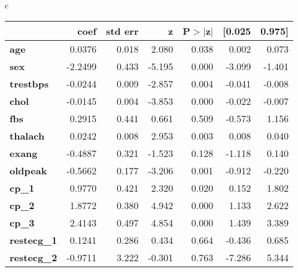 \begin{table*}[!tp]
{{\begin{tabular}{c}
        \begin{tabular*}{\textwidth}{l  @{\extracolsep{\fill}} rrrrrr}
                            & \textbf{coef} & \textbf{std err} & \textbf{z} & \textbf{P$> |$z$|$} & \textbf{[0.025} & \textbf{0.975]}  \\
        \midrule
        \textbf{age}        &       0.0376  &        0.018     &     2.080  &         0.038        &        0.002    &        0.073     \\
        \textbf{sex}        &      -2.2499  &        0.433     &    -5.195  &         0.000        &       -3.099    &       -1.401     \\
        \textbf{trestbps}   &      -0.0244  &        0.009     &    -2.857  &         0.004        &       -0.041    &       -0.008     \\
        \textbf{chol}       &      -0.0145  &        0.004     &    -3.853  &         0.000        &       -0.022    &       -0.007     \\
        \textbf{fbs}        &       0.2915  &        0.441     &     0.661  &         0.509        &       -0.573    &        1.156     \\
        \textbf{thalach}    &       0.0242  &        0.008     &     2.953  &         0.003        &        0.008    &        0.040     \\
        \textbf{exang}      &      -0.4887  &        0.321     &    -1.523  &         0.128        &       -1.118    &        0.140     \\
        \textbf{oldpeak}    &      -0.5662  &        0.177     &    -3.206  &         0.001        &       -0.912    &       -0.220     \\
        \textbf{cp\_1}      &       0.9770  &        0.421     &     2.320  &         0.020        &        0.152    &        1.802     \\
        \textbf{cp\_2}      &       1.8772  &        0.380     &     4.942  &         0.000        &        1.133    &        2.622     \\
        \textbf{cp\_3}      &       2.4143  &        0.497     &     4.854  &         0.000        &        1.439    &        3.389     \\
        \textbf{restecg\_1} &       0.1241  &        0.286     &     0.434  &         0.664        &       -0.436    &        0.685     \\
        \textbf{restecg\_2} &      -0.9711  &        3.222     &    -0.301  &         0.763        &       -7.286    &        5.344     \\

\end{tabular*}
\end{tabular}}}
\end{table*}
